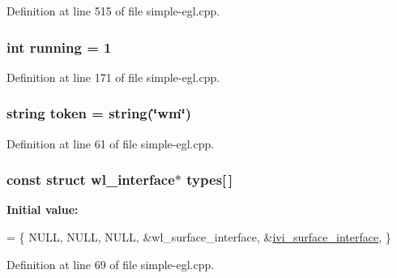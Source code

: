 Definition at line 515 of file simple-\/egl.\+cpp.

\subsubsection[{\texorpdfstring{running}{running}}]{\setlength{\rightskip}{0pt plus 5cm}int running = 1\hspace{0.3cm}{\ttfamily [static]}}\hypertarget{simple-egl_8cpp_a2f45113638a0b749a8a205d2cd7fb42b}{}\label{simple-egl_8cpp_a2f45113638a0b749a8a205d2cd7fb42b}


Definition at line 171 of file simple-\/egl.\+cpp.

\subsubsection[{\texorpdfstring{token}{token}}]{\setlength{\rightskip}{0pt plus 5cm}string token = string(\char`\"{}wm\char`\"{})}\hypertarget{simple-egl_8cpp_a623ef6987ef3bd185c07b28b13e46d34}{}\label{simple-egl_8cpp_a623ef6987ef3bd185c07b28b13e46d34}


Definition at line 61 of file simple-\/egl.\+cpp.

\subsubsection[{\texorpdfstring{types}{types}}]{\setlength{\rightskip}{0pt plus 5cm}const struct wl\+\_\+interface$\ast$ types\mbox{[}$\,$\mbox{]}\hspace{0.3cm}{\ttfamily [static]}}\hypertarget{simple-egl_8cpp_aea3203db9e218d3e5d60bdb4ebe2fa1f}{}\label{simple-egl_8cpp_aea3203db9e218d3e5d60bdb4ebe2fa1f}
{\bfseries Initial value\+:}
\begin{DoxyCode}
= \{
        NULL,
        NULL,
        NULL,
        &wl\_surface\_interface,
        &\hyperlink{simple-egl_8cpp_adf384de8d12d2edd7265ab85fd16b11c}{ivi\_surface\_interface},
\}
\end{DoxyCode}


Definition at line 69 of file simple-\/egl.\+cpp.

